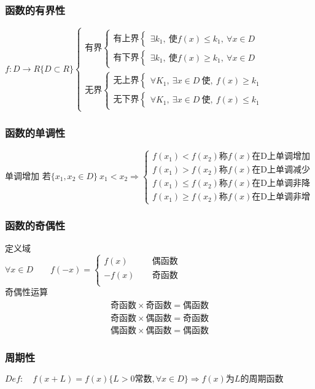  \subsubsection{函数的有界性}
 $f:D\rightarrow R\{D\subset R\}$$\begin{cases}
    \mbox{有界}\begin{cases}
        \mbox{有上界}\begin{cases}
            \exists k_1,\ \mbox{使}f(x)\leqslant k_1,\ \forall x\in D  
        \end{cases}\\
        \mbox{有下界}\begin{cases}
            \exists k_1,\ \mbox{使}f(x)\geqslant  k_1,\ \forall x\in D  
        \end{cases}
    \end{cases}\\
    \mbox{无界}\begin{cases}
        \mbox{无上界}\begin{cases}
            \forall K_1,\ \exists x\in D\ \mbox{使},\ f(x)\geqslant  k_1
        \end{cases}\\
        \mbox{无下界}\begin{cases}
            \forall K_1,\ \exists x\in D\ \mbox{使},\ f(x)\leqslant  k_1
        \end{cases}
    \end{cases}
 \end{cases}$
 \subsubsection{函数的单调性}
 单调增加
 $\mbox{若}\{x_1,x_2\in D\}\ x_1<x_2\Rightarrow \begin{cases}
    f(x_1)<f(x_2)  \mbox{称}f(x)\mbox{在D上单调增加}\\
    f(x_1)>f(x_2)  \mbox{称}f(x)\mbox{在D上单调减少}\\
    f(x_1)\leqslant f(x_2)  \mbox{称}f(x)\mbox{在D上单调非降}\\
    f(x_1)\geqslant f(x_2)  \mbox{称}f(x)\mbox{在D上单调非增}
 \end{cases}$
 \subsubsection{函数的奇偶性}
 定义域\\ 
 \bigskip
 $\forall x\in D\qquad f(-x)=\begin{cases}
    f(x)\qquad &\mbox{偶函数}\\
    -f(x) &\mbox{奇函数}\\
 \end{cases}$\\
 \bigskip
 奇偶性运算
\begin{align}
    \mbox{奇函数}\times \mbox{奇函数}=\mbox{偶函数}\\
    \mbox{奇函数}\times \mbox{偶函数}=\mbox{奇函数}\\
    \mbox{偶函数}\times \mbox{偶函数}=\mbox{偶函数}
 \end{align}
 \subsubsection{周期性}
 $Def:\quad f(x+L)=f(x) \{L>0\mbox{常数},\forall x\in D\}\Rightarrow \mbox{$f(x)$为$L$的周期函数}$